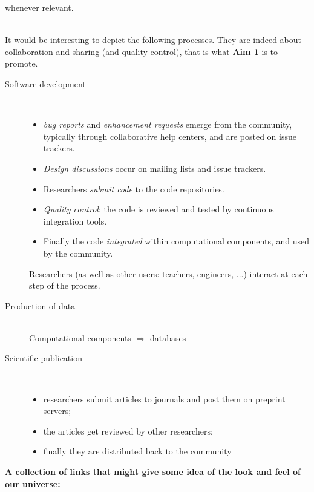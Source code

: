 \documentclass[a4paper,11pt]{article}
\begin{document}
{\begin{description}
\begin{itemize}
\begin{itemize}
        whenever relevant.
      \end{itemize}
    \end{itemize}
  \item[Flow of information and processes:]\ \\
    It would be interesting to depict the following processes. They
    are indeed about collaboration and sharing (and quality control),
    that is what \textbf{Aim 1} is to promote.
    \begin{description}
    \item[Software development]\ 
      \begin{itemize}
      \item \emph{bug reports} and \emph{enhancement requests} emerge
        from the community, typically through collaborative help
        centers, and are posted on issue trackers.
      \item \emph{Design discussions} occur on mailing lists and issue
        trackers.
      \item Researchers \emph{submit code} to the code repositories.
      \item \emph{Quality control}: the code is reviewed and
        tested by continuous integration tools.
      \item Finally the code \emph{integrated} within computational
        components, and used by the community.
      \end{itemize}
      Researchers (as well as other users: teachers, engineers, ...)
      interact at each step of the process.
    \item[Production of data]\ \\
      Computational components $\Longrightarrow$ databases
    \item[Scientific publication]\ 
      \begin{itemize}
      \item researchers submit articles to journals and post them on
        preprint servers;
      \item the articles get reviewed by other researchers;
      \item finally they are distributed back to the community
      \end{itemize}
    \end{description}
  \end{description}
  \textbf{\Large A collection of links that might give some idea of
    the look and feel of our universe:}
  \begin{description}

\end{description}}
\end{document}

